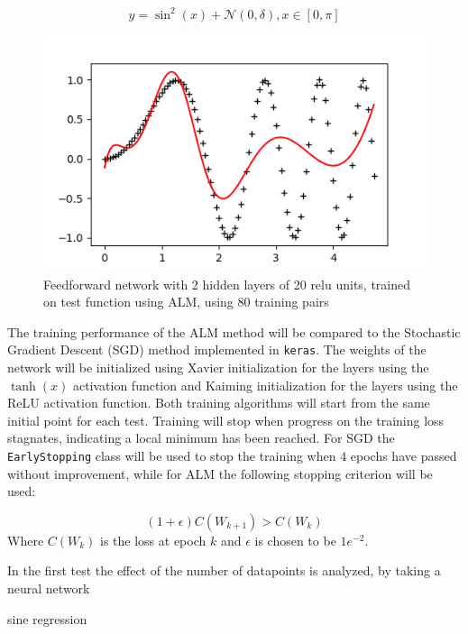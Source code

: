 \begin{equation}
y = \sin^2(x) + \mathcal N(0,\delta), x \in [0,\pi]
\end{equation}

\begin{figure}
         \centering
         \includegraphics[width=\textwidth]{sine_squared}
         \caption{Feedforward network with 2 hidden layers of 20 relu units, trained on test function using ALM, using 80 training pairs}
\end{figure}

The training performance of the ALM method will be compared to the Stochastic Gradient Descent (SGD) method implemented in \texttt{keras}. The weights of the network will be initialized using Xavier initialization for the layers using the $\tanh(x)$ activation function and Kaiming initialization for the layers using the ReLU activation function. Both training algorithms will start from the same initial point for each test. Training will stop when progress on the training loss stagnates, indicating a local minimum has been reached. For SGD the \texttt{EarlyStopping} class will be used to stop the training when 4 epochs have passed without improvement, while for ALM the following stopping criterion will be used:

\begin{equation}
(1+\epsilon)C(W_{k+1}) > C(W_k)
\end{equation}
Where $C(W_k)$ is the loss at epoch $k$ and $\epsilon$ is chosen to be $1e^{-2}$.

In the first test the effect of the number of datapoints is analyzed, by taking a neural network

sine regression






